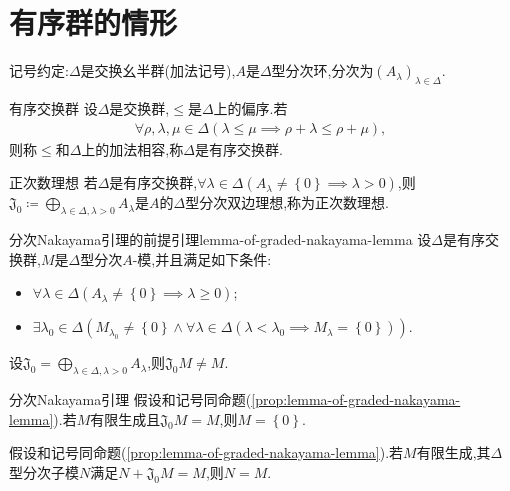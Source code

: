 \section{有序群的情形}

记号约定:$\Delta$是交换幺半群(加法记号),$A$是$\Delta$型分次环,分次为$\left(A_{\lambda}\right)_{\lambda\in\Delta}$.

\begin{definition}{有序交换群}{}
	设$\Delta$是交换群,$\leqslant$是$\Delta$上的偏序.若
	\begin{align*}
		\forall\rho,\lambda,\mu\in\Delta\left(\lambda\leqslant\mu\implies\rho+\lambda\leqslant\rho+\mu\right),
	\end{align*}
	则称$\leqslant$和$\Delta$上的加法相容,称$\Delta$是有序交换群.
\end{definition}

\begin{definition}{正次数理想}{}
	若$\Delta$是有序交换群,$\forall\lambda\in\Delta\left(A_{\lambda}\neq\left\{0\right\}\implies\lambda >0\right)$,则$\mathfrak{J}_{0}\coloneq\bigoplus\limits_{\lambda\in\Delta,\lambda>0}A_{\lambda}$是$A$的$\Delta$型分次双边理想,称为正次数理想.
\end{definition}

\begin{proposition}{分次Nakayama引理的前提引理}{lemma-of-graded-nakayama-lemma}
	设$\Delta$是有序交换群,$M$是$\Delta$型分次$A$-模,并且满足如下条件:
	\begin{itemize}
		\item $\forall\lambda\in\Delta\left(A_{\lambda}\neq\left\{0\right\}\implies\lambda\geq 0\right)$;
		\item $\exists\lambda_{0}\in\Delta\left(M_{\lambda_{0}}\neq\left\{0\right\}\wedge\forall\lambda\in\Delta\left(\lambda<\lambda_{0}\implies M_{\lambda}=\left\{0\right\}\right)\right)$.
	\end{itemize}
	设$\mathfrak{J}_{0}=\bigoplus\limits_{\lambda\in\Delta,\lambda>0}A_{\lambda}$,则$\mathfrak{J}_{0}M\neq M$.
\end{proposition}

\begin{corollary}{分次Nakayama引理}{}
	假设和记号同命题(\cref{prop:lemma-of-graded-nakayama-lemma}).若$M$有限生成且$\mathfrak{J}_{0}M=M$,则$M=\left\{0\right\}$.
\end{corollary}

\begin{corollary}{}{}
	假设和记号同命题(\cref{prop:lemma-of-graded-nakayama-lemma}).若$M$有限生成,其$\Delta$型分次子模$N$满足$N+\mathfrak{J}_{0}M=M$,则$N=M$.
\end{corollary}

